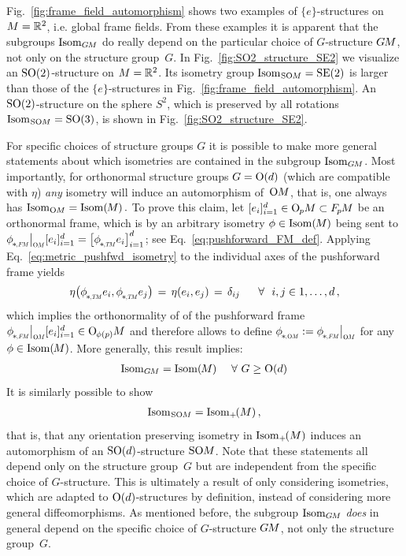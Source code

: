 Fig.~\ref{fig:frame_field_automorphism} shows two examples of $\{e\}$-structures on $M=\mathbb{R}^2$, i.e. global frame fields.
From these examples it is apparent that the subgroups $\operatorname{Isom}_{G\mkern-1.4muM}$ do really depend on the particular choice of $G$-structure $G\mkern-1.4muM$, not only on the structure group~$G$.
In Fig.~\ref{fig:SO2_structure_SE2} we visualize an $\operatorname{SO}(2)$-structure on $M=\mathbb{R}^2$.
Its isometry group $\operatorname{Isom}_{\mkern1mu\operatorname{SO}\mkern-3.6muM} = \operatorname{SE}(2)$ is larger than those of the $\{e\}$-structures in Fig.~\ref{fig:frame_field_automorphism}.
An $\operatorname{SO}(2)$-structure on the sphere $S^2$, which is preserved by all rotations $\operatorname{Isom}_{\mkern1mu\operatorname{SO}\mkern-3.6muM} = \operatorname{SO}(3)$, is shown in Fig.~\ref{fig:SO2_structure_SE2}.


For specific choices of structure groups $G$ it is possible to make more general statements about which isometries are contained in the subgroup $\operatorname{Isom}_{G\mkern-1.4muM}$.
Most importantly, for orthonormal structure groups $G=\operatorname{O}(d)$ (which are compatible with $\eta$) \emph{any} isometry will induce an automorphism of~$\operatorname{O}\mkern-3.6muM$, that is, one always has $\operatorname{Isom}_{\operatorname{O}\mkern-3.6muM} = \operatorname{Isom}(\mkern-1.5mu M \mkern-.5mu) \,.$
To prove this claim, let $[e_i]_{i=1}^d \in \operatorname{O}_{\mkern-1.1mu p}\mkern-3.4muM \subset F_{\mkern-1.5mu p}\mkern-1.0muM$ be an orthonormal frame, which is by an arbitrary isometry $\phi \in \operatorname{Isom}(\mkern-1.5mu M \mkern-.5mu)$ being sent to $\dphiFM \big|_{\scalebox{.58}{$\OM$}} [e_i]_{i=1}^d = \big[\dphiTM e_i\big]_{i=1}^d$; see Eq.~\eqref{eq:pushforward_FM_def}.
Applying Eq.~\eqref{eq:metric_pushfwd_isometry} to the individual axes of the pushforward frame yields
\begin{align}\label{eq:isom_orthonormal_to_orthonormal_frames}
    \eta\big( \dphiTM e_i, \dphiTM e_j \big) \,=\, \eta(e_i, e_j) \,=\, \delta_{ij}\ \quad\ \forall\ \ i,j \in 1,\dots,d \,,
\end{align}
which implies the orthonormality of of the pushforward frame $\dphiFM \big|_{\scalebox{.58}{$\OM$}} [e_i]_{i=1}^d \in \OphipM$ and therefore allows to define $\dphiOM := \dphiFM \big|_{\scalebox{.58}{$\OM$}}$ for any $\phi \in \operatorname{Isom}(\mkern-1.5mu M \mkern-.5mu)$.
More generally, this result implies:
\begin{align}\label{eq:isomM_isomOM}
    \operatorname{Isom}_{G\mkern-1.4muM} = \operatorname{Isom}(\mkern-1.5mu M \mkern-.5mu) \quad \ \forall\ G \geq \operatorname{O}(d)
\end{align}
It is similarly possible to show
\begin{align}\label{eq:isomplusM_isomSOM}
    \operatorname{Isom}_{\mkern1mu\operatorname{SO}\mkern-3.6muM} = \operatorname{Isom}_+\mkern-2mu(M) \,,
\end{align}
that is, that any orientation preserving isometry in $\operatorname{Isom}_+\mkern-2mu(M)$ induces an automorphism of an $\operatorname{SO}(d)$-structure $\operatorname{SO}\mkern-3.6muM$.
Note that these statements all depend only on the structure group~$G$ but are independent from the specific choice of $G$-structure.
This is ultimately a result of only considering isometries, which are adapted to $\operatorname{O}(d)$-structures by definition, instead of considering more general diffeomorphisms.
As mentioned before, the subgroup $\operatorname{Isom}_{G\mkern-1.4muM}$ \emph{does} in general depend on the specific choice of $G$-structure $G\mkern-1.4muM$, not only the structure group~$G$.


